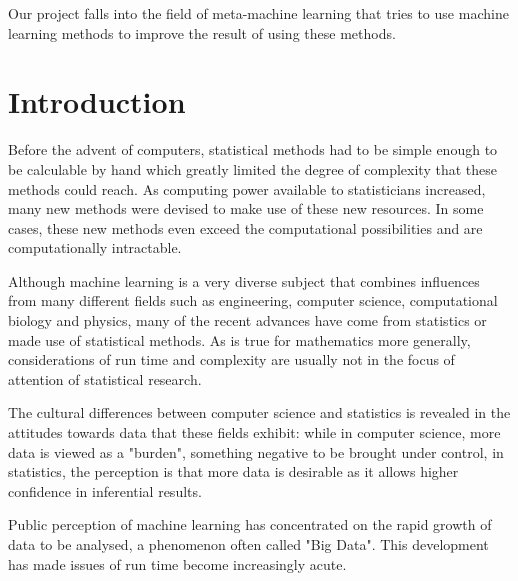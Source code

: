 \documentclass[a4paper,12pt,twoside,openright]{report}
\begin{document}
\pagestyle{empty}
\singlespacing

\onehalfspacing

\singlespacing


Our project falls into the field of meta-machine learning that tries to use machine learning methods to improve the result of using these methods.

\setcounter{page}{0}
\pagestyle{plain}
\tableofcontents
\listoffigures
\listoftables

\onehalfspacing


\chapter{Introduction}

\setcounter{page}{1}

Before the advent of computers, statistical methods had to be simple enough to be calculable by hand which greatly limited the degree of complexity that these methods could reach. As computing power available to statisticians increased, many new methods were devised to make use of these new resources. In some cases, these new methods even exceed the computational possibilities and are computationally intractable. 

Although machine learning is a very diverse subject that combines influences from many different fields such as engineering, computer science, computational biology and physics, many of the recent advances have come from statistics or made use of statistical methods. As is true for mathematics more generally, considerations of run time and complexity are usually not in the focus of attention of statistical research. 

The cultural differences between computer science and statistics is revealed in the attitudes towards data that these fields exhibit: while in computer science, more data is viewed as a "burden", something negative to be brought under control, in statistics, the perception is that more data is desirable as it allows higher confidence in inferential results.

Public perception of machine learning has concentrated on the rapid growth of data to be analysed, a phenomenon often called "Big Data". This development has made issues of run time become increasingly acute. 
\end{document}
